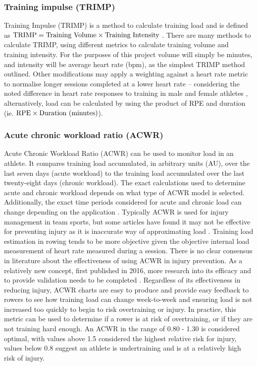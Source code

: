 \subsubsection{Training impulse (TRIMP)\label{subsec:trimp}}
Training Impulse (TRIMP) is a method to calculate training load and is defined as  $\textnormal{TRIMP} = \textnormal{Training Volume} \times \textnormal{Training Intensity}$ \autocite{TRIMPmethod}. There are many methods to calculate TRIMP, using different metrics to calculate training volume and training intensity. For the purposes of this project volume will simply be minutes, and intensity will be average heart rate (bpm), as the simplest TRIMP method outlined. Other modifications may apply a weighting against a heart rate metric to normalise longer sessions completed at a lower heart rate -- considering the noted difference in heart rate responses to training in male and female athletes \autocite{Morton1990}, alternatively, load can be calculated by using the product of RPE and duration (ie. $\textnormal{RPE} \times \textnormal{Duration (minutes)}$).

\subsubsection{Acute chronic workload ratio (ACWR)}
Acute Chronic Workload Ratio (ACWR) can be used to monitor load in an athlete. It compares training load accumulated, in arbitrary units (AU), over the last seven days (acute workload) to the training load accumulated over the last twenty-eight days (chronic workload). The exact calculations used to determine acute and chronic workload depends on what type of ACWR model is selected. Additionally, the exact time periods considered for acute and chronic load can change depending on the application \cite{White2023}. Typically ACWR is used for injury management in team sports, but some articles have found it may not be effective for preventing injury as it is inaccurate way of approximating load \cite{Impellizzeri2020}. Training load estimation in rowing tends to be more objective given the objective internal load measurement of heart rate measured during a session. There is no clear consensus in literature about the effectiveness of using ACWR in injury prevention. As a relatively new concept, first published in 2016, more research into its efficacy and to provide validation needs to be completed \cite{Zouhal2021}. Regardless of its effectiveness in reducing injury, ACWR charts are easy to produce and provide easy feedback to rowers to see how training load can change week-to-week and ensuring load is not increased too quickly to begin to risk overtraining or injury. 
In practice, this metric can be used to determine if a rower is at risk of overtraining, or if they are not training hard enough. An ACWR in the range of 0.80 - 1.30 is considered optimal, with values above 1.5 considered the highest relative risk for injury, values below 0.8 suggest an athlete is undertraining and is at a relatively high risk of injury.

